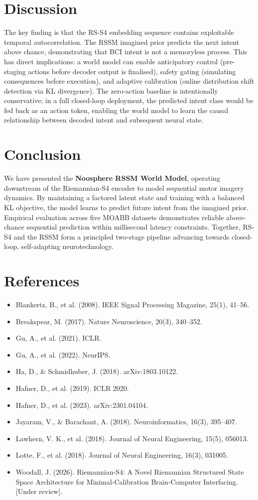 \documentclass[11pt,a4paper]{article}
\begin{document}
\section{Discussion}
The key finding is that the RS-S4 embedding sequence contains exploitable temporal autocorrelation. The RSSM imagined prior predicts the next intent above chance, demonstrating that BCI intent is not a memoryless process. This has direct implications: a world model can enable anticipatory control (pre-staging actions before decoder output is finalised), safety gating (simulating consequences before execution), and adaptive calibration (online distribution shift detection via KL divergence). The zero-action baseline is intentionally conservative; in a full closed-loop deployment, the predicted intent class would be fed back as an action token, enabling the world model to learn the causal relationship between decoded intent and subsequent neural state.

\section{Conclusion}
We have presented the \textbf{Noosphere RSSM World Model}, operating downstream of the Riemannian-S4 encoder to model sequential motor imagery dynamics. By maintaining a factored latent state and training with a balanced KL objective, the model learns to predict future intent from the imagined prior. Empirical evaluation across five MOABB datasets demonstrates reliable above-chance sequential prediction within millisecond latency constraints. Together, RS-S4 and the RSSM form a principled two-stage pipeline advancing towards closed-loop, self-adapting neurotechnology.

\section{References}
\begin{itemize}
    \item Blankertz, B., et al. (2008). IEEE Signal Processing Magazine, 25(1), 41--56.
    \item Breakspear, M. (2017). Nature Neuroscience, 20(3), 340--352.
    \item Gu, A., et al. (2021). ICLR.
    \item Gu, A., et al. (2022). NeurIPS.
    \item Ha, D., \& Schmidhuber, J. (2018). arXiv:1803.10122.
    \item Hafner, D., et al. (2019). ICLR 2020.
    \item Hafner, D., et al. (2023). arXiv:2301.04104.
    \item Jayaram, V., \& Barachant, A. (2018). Neuroinformatics, 16(3), 395--407.
    \item Lawhern, V. K., et al. (2018). Journal of Neural Engineering, 15(5), 056013.
    \item Lotte, F., et al. (2018). Journal of Neural Engineering, 16(3), 031005.
    \item Woodall, J. (2026). Riemannian-S4: A Novel Riemannian Structured State Space Architecture for Minimal-Calibration Brain-Computer Interfacing. [Under review]. \label{woodall2026rss4}
\end{itemize}
\end{document}
